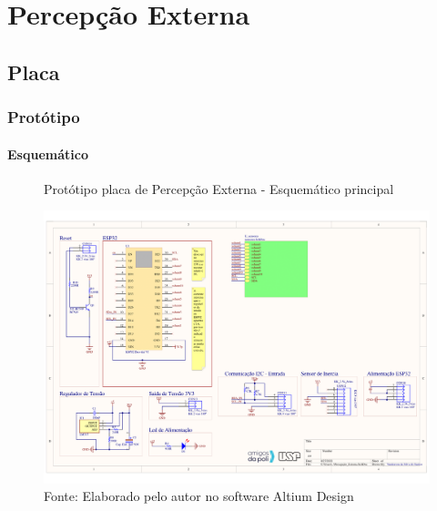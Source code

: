 \documentclass[../delivery_hospital_report.tex]{subfiles}
\begin{document}
\section{Percepção Externa}
\subsection{Placa}

\subsubsection{Protótipo}

\paragraph{Esquemático}

\begin{figure}[h]
\centering
    \caption{Protótipo placa de Percepção Externa - Esquemático principal }
    \centering %
    \includegraphics[width=17cm]{modulos/Percepção_Externa-1.png}
    \caption*{Fonte: Elaborado pelo autor no software Altium Design\cite{altium21} }
    \label{Protótipo placa de ## - Esquemático principal}
\end{figure}
\end{document}
